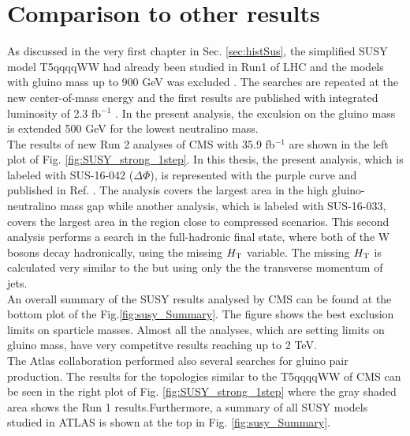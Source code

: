 \section{Comparison to other results}
\label{sec:Comparison}
As discussed in the very first chapter in Sec. \ref{sec:histSus}, the simplified SUSY model T5qqqqWW had already been studied in Run1 of LHC and the models with gluino mass up to 900  GeV was excluded \cite{SUSRun1}. The searches are repeated at the new center-of-mass energy and the first results are published with integrated luminosity of 2.3 fb$^{-1}$ \cite{SUS_16_005}. In the present analysis, the exculsion on the gluino mass is extended 500 GeV for the lowest neutralino mass.\\
The results of new Run 2 analyses of CMS with 35.9 fb$^{-1}$ are shown in the left plot of Fig. \ref{fig:SUSY_strong_1step}. In this thesis, the present analysis, which is labeled with SUS-16-042 ($\Delta\Phi$), is represented with the purple curve and published in Ref. \cite{SUS_16_042}. The analysis covers the largest area in the high gluino-neutralino mass gap while another analysis, which is labeled with SUS-16-033, covers the largest area in the region close to compressed scenarios. This second analysis \cite{SUS-16-033} performs a search in the full-hadronic final state, where both of the W bosons decay hadronically, using the missing $H_{\rm T}$ variable. The missing $H_{\rm T}$ is calculated very similar to the \MET but using only the the transverse momentum of jets.\\
An overall summary of the SUSY results analysed by CMS can be found at the bottom plot of the Fig.\ref{fig:susy_Summary}. The figure shows the best exclusion limits on sparticle masses. Almost all the analyses, which are setting limits on gluino mass, have very competitve results reaching up to 2 TeV. \\
The Atlas collaboration performed also several searches for gluino pair production. The results for the topologies similar to the T5qqqqWW of CMS can be seen in the right plot of Fig. \ref{fig:SUSY_strong_1step} where the gray shaded area shows the Run 1 results.Furthermore, a summary of all SUSY models studied in ATLAS is shown at the top in Fig. \ref{fig:susy_Summary}. \\

